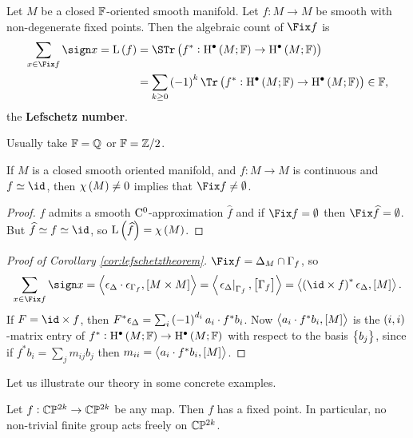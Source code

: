 \begin{corollary}
\label{cor:lefschetztheorem}
Let $ M $ be a closed $ \mathbb{F} $-oriented smooth manifold. Let $ f : M \to M $ be smooth with non-degenerate fixed points. Then the algebraic count of $ \Fix f $ is
\begin{align*}
\sum_{x \in \Fix f} \sign x
= \L\br{f}
& = \STr \br{f^* : \H^\bullet\br{M; \FF} \to \H^\bullet\br{M; \FF}} \\
& = \sum_{k \ge 0} \br{-1}^k\Tr \br{f^* : \H^\bullet\br{M; \FF} \to \H^\bullet\br{M; \FF}} \in \FF,
\end{align*}
the \textbf{Lefschetz number}.
\end{corollary}

Usually take $ \mathbb{F} = \mathbb{Q} $ or $ \mathbb{F} = \mathbb{Z} / 2 $.

\begin{corollary}
If $ M $ is a closed smooth oriented manifold, and $ f : M \to M $ is continuous and $ f \simeq \id $, then $ \chi\br{M} \ne 0 $ implies that $ \Fix f \ne \emptyset $.
\end{corollary}

\begin{proof}
$ f $ admits a smooth $ \mathrm{C}^0 $-approximation $ \widehat{f} $ and if $ \Fix f = \emptyset $ then $ \Fix \widehat{f} = \emptyset $. But $ \widehat{f} \simeq f \simeq \id $, so $ \L\br{\widehat{f}} = \chi\br{M} $.
\end{proof}

\pagebreak

\begin{proof}[Proof of Corollary \ref{cor:lefschetztheorem}]
$ \Fix f = \Delta_M \cap \Gamma_f $, so
$$ \sum_{x \in \Fix f} \sign x = \abr{\epsilon_\Delta \cdot \epsilon_{\Gamma_f}, \sbr{M \times M}} = \abr{\eval{\epsilon_\Delta}_{\Gamma_f}, \sbr{\Gamma_f}} = \abr{\br{\id \times f}^*\epsilon_\Delta, \sbr{M}}. $$
If $ F = \id \times f $, then $ F^*\epsilon_\Delta = \sum_i \br{-1}^{d_i}a_i \cdot f^*b_i $. Now $ \abr{a_i \cdot f^*b_i, \sbr{M}} $ is the $ \br{i, i} $-matrix entry of $ f^* : \H^\bullet\br{M; \FF} \to \H^\bullet\br{M; \FF} $ with respect to the basis $ \cbr{b_j} $, since if $ f^*b_i = \sum_j m_{ij}b_j $ then $ m_{ii} = \abr{a_i \cdot f^*b_i, \sbr{M}} $.
\end{proof}


Let us illustrate our theory in some concrete examples.

\begin{corollary}
Let $ f : \mathbb{C}\mathbb{P}^{2k} \to \mathbb{C}\mathbb{P}^{2k} $ be any map. Then $ f $ has a fixed point. In particular, no non-trivial finite group acts freely on $ \mathbb{C}\mathbb{P}^{2k} $.
\end{corollary}


